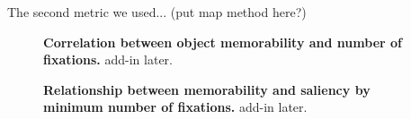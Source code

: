 The second metric we used... (put map method here?)

\begin{figure}[t]
\centering
{}
\vspace{-5mm}\caption{\footnotesize\textbf{Correlation between object memorability and number of fixations.} add-in later. }\label{fig:exampleStimuli}
\end{figure}

\begin{figure}[t]
\centering
{}
\vspace{-5mm}\caption{\footnotesize\textbf{Relationship between memorability and saliency by minimum number of fixations.} add-in later. }\label{fig:exampleStimuli}
\end{figure}

